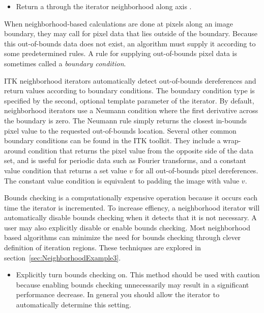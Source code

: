 {\begin{itemize}
\item \textbf{} Return a
 through the iterator neighborhood along axis .

\end{itemize}

When neighborhood-based calculations are done at pixels along an image
boundary, they may call for pixel data that lies outside of the boundary.
Because this out-of-bounds data does not exist, an algorithm must supply it
according to some predetermined rules.  A rule for supplying out-of-bounds
pixel data is sometimes called a \emph{boundary condition}.
 
ITK neighborhood iterators automatically detect out-of-bounds dereferences and
return values according to boundary conditions.  The boundary condition type is
specified by the second, optional template parameter of the iterator.  By
default, neighborhood iterators use a Neumann condition where the first
derivative across the boundary is zero.  The Neumann rule simply returns the
closest in-bounds pixel value to the requested out-of-bounds location.  Several
other common boundary conditions can be found in the ITK toolkit.  They include
a wrap-around condition that returns the pixel value from the opposite side of
the data set, and is useful for periodic data such as Fourier transforms, and a
constant value condition that returns a set value $v$ for all out-of-bounds pixel
dereferences.  The constant value condition is equivalent to padding the image
with value $v$.

Bounds checking is a computationally expensive operation because it occurs each
time the iterator is incremented.  To increase effiency, a neighborhood
iterator will automatically disable bounds checking when it detects that it is
not necessary.  A user may also explicitly disable or enable bounds checking.
Most neighborhood based algorithms can minimize the need for bounds checking
through clever definition of iteration regions.  These techniques are explored
in section~\ref{sec:NeighborhoodExample3}.

\begin{itemize}
\item \textbf{} Explicitly turn
bounds checking on.  This method should be used with caution because
enabling bounds checking unnecessarily may result in a significant performance
decrease. In general you should allow the iterator to automatically determine
this setting.


\end{itemize}}
